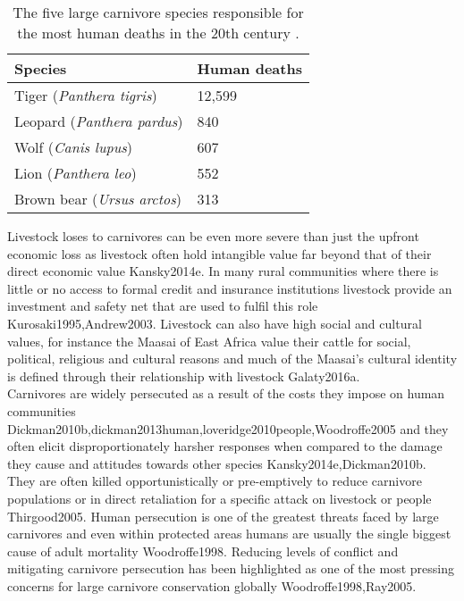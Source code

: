 \begin{table}[h]
	\small
	\begin{center}
		\begin{tabular}{l l}
			\hline \hline		
			Species 				& Human deaths\\ \hline
			Tiger (\textit{Panthera tigris})				& 12,599\\
			Leopard 	(\textit{Panthera pardus})			& 840\\
			Wolf	 (\textit{Canis lupus})			 		& 607\\
			Lion	 (\textit{Panthera leo})					& 552\\
			Brown bear (\textit{Ursus arctos}) 			& 313\\
			\hline \hline						
		\end{tabular}
		\caption{The five large carnivore species responsible for the most human deaths in the 20th century \cite{Loe2004a}.}
	\label{table:Deaths}
	\end{center}
\end{table}

Livestock loses to carnivores can be even more severe than just the upfront economic loss as livestock often hold intangible value far beyond that of their direct economic value {Kansky2014e}. In many rural communities where there is little or no access to formal credit and insurance institutions livestock provide an investment and safety net that are used to fulfil this role {Kurosaki1995,Andrew2003}. Livestock can also have high social and cultural values, for instance the Maasai of East Africa value their cattle for social, political, religious and cultural reasons and much of the Maasai's cultural identity is defined through their relationship with livestock {Galaty2016a}.\\

Carnivores are widely persecuted as a result of the costs they impose on human communities {Dickman2010b,dickman2013human,loveridge2010people,Woodroffe2005} and they often elicit disproportionately harsher responses when compared to the damage they cause and attitudes towards other species {Kansky2014e,Dickman2010b}. They are often killed opportunistically or pre-emptively to reduce carnivore populations or in direct retaliation for a specific attack on livestock or people {Thirgood2005}. Human persecution is one of the greatest threats faced by large carnivores and even within protected areas humans are usually the single biggest cause of adult mortality {Woodroffe1998}. Reducing levels of conflict and mitigating carnivore persecution has been highlighted as one of the most pressing concerns for large carnivore conservation globally {Woodroffe1998,Ray2005}.\\

